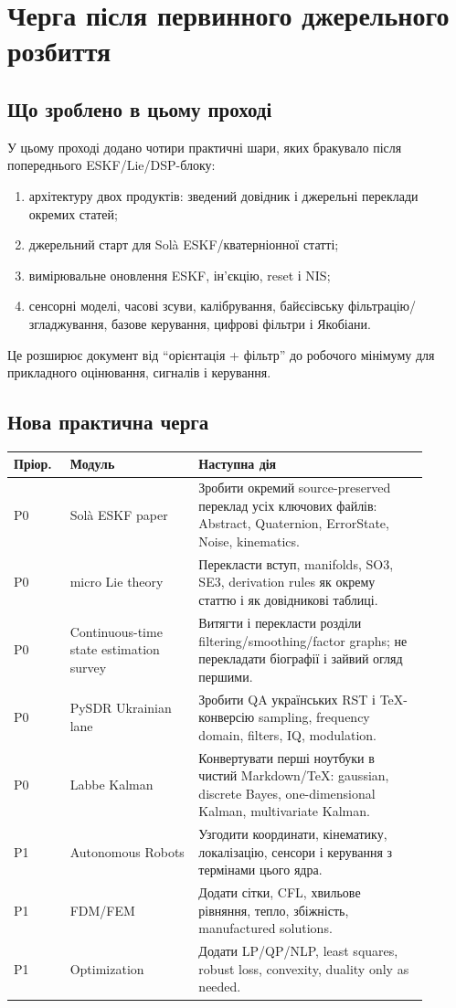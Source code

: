 
\chapter{Черга після первинного джерельного розбиття}

\section{Що зроблено в цьому проході}

У цьому проході додано чотири практичні шари, яких бракувало після попереднього ESKF/Lie/DSP-блоку:

\begin{enumerate}
\item архітектуру двох продуктів: зведений довідник і джерельні переклади окремих статей;
\item джерельний старт для Solà ESKF/кватерніонної статті;
\item вимірювальне оновлення ESKF, ін'єкцію, reset і NIS;
\item сенсорні моделі, часові зсуви, калібрування, байєсівську фільтрацію/згладжування, базове керування, цифрові фільтри і Якобіани.
\end{enumerate}

Це розширює документ від ``орієнтація + фільтр'' до робочого мінімуму для прикладного оцінювання, сигналів і керування.

\section{Нова практична черга}

\begin{longtable}{L{0.12\linewidth}L{0.28\linewidth}L{0.50\linewidth}}
\toprule
Пріор. & Модуль & Наступна дія\\
\midrule
P0 & Solà ESKF paper & Зробити окремий source-preserved переклад усіх ключових файлів: Abstract, Quaternion, ErrorState, Noise, kinematics.\\
P0 & micro Lie theory & Перекласти вступ, manifolds, SO3, SE3, derivation rules як окрему статтю і як довідникові таблиці.\\
P0 & Continuous-time state estimation survey & Витягти і перекласти розділи filtering/smoothing/factor graphs; не перекладати біографії і зайвий огляд першими.\\
P0 & PySDR Ukrainian lane & Зробити QA українських RST і TeX-конверсію sampling, frequency domain, filters, IQ, modulation.\\
P0 & Labbe Kalman & Конвертувати перші ноутбуки в чистий Markdown/TeX: gaussian, discrete Bayes, one-dimensional Kalman, multivariate Kalman.\\
P1 & Autonomous Robots & Узгодити координати, кінематику, локалізацію, сенсори і керування з термінами цього ядра.\\
P1 & FDM/FEM & Додати сітки, CFL, хвильове рівняння, тепло, збіжність, manufactured solutions.\\
P1 & Optimization & Додати LP/QP/NLP, least squares, robust loss, convexity, duality only as needed.\\
\bottomrule
\end{longtable}


